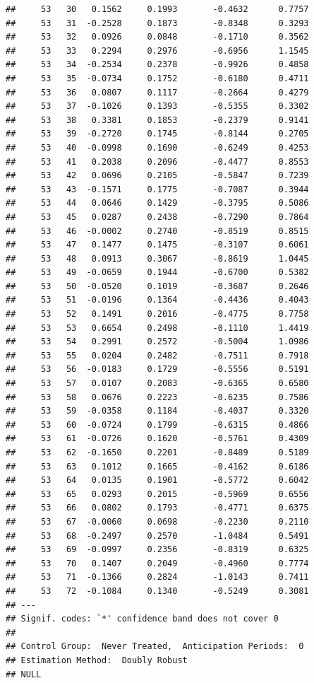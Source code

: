 \documentclass[
]{article}
\begin{document}
\begin{verbatim}
##     53   30   0.1562     0.1993       -0.4632      0.7757  
##     53   31  -0.2528     0.1873       -0.8348      0.3293  
##     53   32   0.0926     0.0848       -0.1710      0.3562  
##     53   33   0.2294     0.2976       -0.6956      1.1545  
##     53   34  -0.2534     0.2378       -0.9926      0.4858  
##     53   35  -0.0734     0.1752       -0.6180      0.4711  
##     53   36   0.0807     0.1117       -0.2664      0.4279  
##     53   37  -0.1026     0.1393       -0.5355      0.3302  
##     53   38   0.3381     0.1853       -0.2379      0.9141  
##     53   39  -0.2720     0.1745       -0.8144      0.2705  
##     53   40  -0.0998     0.1690       -0.6249      0.4253  
##     53   41   0.2038     0.2096       -0.4477      0.8553  
##     53   42   0.0696     0.2105       -0.5847      0.7239  
##     53   43  -0.1571     0.1775       -0.7087      0.3944  
##     53   44   0.0646     0.1429       -0.3795      0.5086  
##     53   45   0.0287     0.2438       -0.7290      0.7864  
##     53   46  -0.0002     0.2740       -0.8519      0.8515  
##     53   47   0.1477     0.1475       -0.3107      0.6061  
##     53   48   0.0913     0.3067       -0.8619      1.0445  
##     53   49  -0.0659     0.1944       -0.6700      0.5382  
##     53   50  -0.0520     0.1019       -0.3687      0.2646  
##     53   51  -0.0196     0.1364       -0.4436      0.4043  
##     53   52   0.1491     0.2016       -0.4775      0.7758  
##     53   53   0.6654     0.2498       -0.1110      1.4419  
##     53   54   0.2991     0.2572       -0.5004      1.0986  
##     53   55   0.0204     0.2482       -0.7511      0.7918  
##     53   56  -0.0183     0.1729       -0.5556      0.5191  
##     53   57   0.0107     0.2083       -0.6365      0.6580  
##     53   58   0.0676     0.2223       -0.6235      0.7586  
##     53   59  -0.0358     0.1184       -0.4037      0.3320  
##     53   60  -0.0724     0.1799       -0.6315      0.4866  
##     53   61  -0.0726     0.1620       -0.5761      0.4309  
##     53   62  -0.1650     0.2201       -0.8489      0.5189  
##     53   63   0.1012     0.1665       -0.4162      0.6186  
##     53   64   0.0135     0.1901       -0.5772      0.6042  
##     53   65   0.0293     0.2015       -0.5969      0.6556  
##     53   66   0.0802     0.1793       -0.4771      0.6375  
##     53   67  -0.0060     0.0698       -0.2230      0.2110  
##     53   68  -0.2497     0.2570       -1.0484      0.5491  
##     53   69  -0.0997     0.2356       -0.8319      0.6325  
##     53   70   0.1407     0.2049       -0.4960      0.7774  
##     53   71  -0.1366     0.2824       -1.0143      0.7411  
##     53   72  -0.1084     0.1340       -0.5249      0.3081  
## ---
## Signif. codes: `*' confidence band does not cover 0
## 
## Control Group:  Never Treated,  Anticipation Periods:  0
## Estimation Method:  Doubly Robust
## NULL
\end{verbatim}
\end{document}
